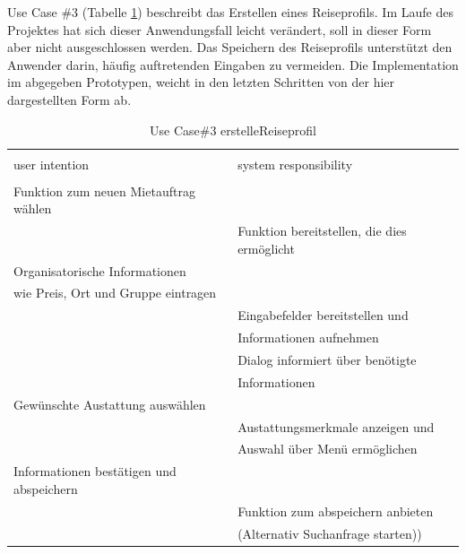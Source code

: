 \newpage
Use Case \#3 (Tabelle \ref{tab:mietauftragUC}) beschreibt das Erstellen eines Reiseprofils. Im Laufe des Projektes hat sich dieser Anwendungsfall leicht verändert, soll in dieser Form aber nicht ausgeschlossen werden. Das Speichern des Reiseprofils unterstützt den Anwender darin, häufig auftretenden Eingaben zu vermeiden. Die Implementation im abgegeben Prototypen, weicht in den letzten Schritten von der hier dargestellten Form ab.
\begin{table}[H]
\caption{Use Case\#3 erstelleReiseprofil }
\centering
\begin{tabular}{l l}
\\ [-0.5ex]

\hline\hline
\\ [-0.5ex]
user intention & system responsibility
\\ [1.5ex]
\hline
\\ [-0.5ex]
Funktion zum neuen Mietauftrag wählen     &                                   \\[1ex]
                                 & Funktion bereitstellen, die dies ermöglicht   \\[1ex]
Organisatorische Informationen & \\[1ex]
wie Preis, Ort und Gruppe eintragen  &                                   \\[1ex] 
                                          & Eingabefelder bereitstellen und            \\[1ex]
                                          & Informationen aufnehmen                 \\[1ex]
                                          & Dialog informiert über benötigte \\[1ex]
                                          & Informationen \\[1ex]
Gewünschte Austattung auswählen           &                                   \\[1ex]
                                          & Austattungsmerkmale anzeigen und           \\[1ex]
                                         & Auswahl über Menü ermöglichen           \\[1ex]
Informationen bestätigen und abspeichern  &                                   \\[1ex]
                                          & Funktion zum abspeichern anbieten          \\[1ex]
                                          & (Alternativ Suchanfrage starten))         \\[1ex]
\hline
\end{tabular}
\label{tab:mietauftragUC}
\end{table}

